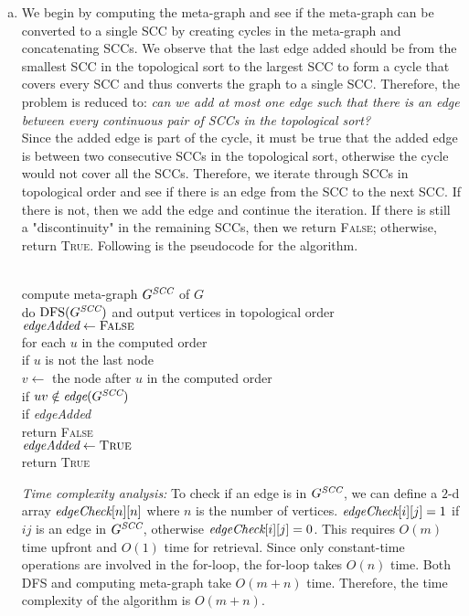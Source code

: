 \documentclass[11pt]{article}
\begin{document}
\begin{solution}
\begin{enumerate}[(a)]
\item We begin by computing the meta-graph and see if the meta-graph can be converted to a single SCC by creating cycles in the meta-graph and concatenating SCCs. We observe that the last edge added should be from the smallest SCC in the topological sort to the largest SCC to form a cycle that covers every SCC and thus converts the graph to a single SCC. Therefore, the problem is reduced to: \emph{can we add at most one edge such that there is an edge between every continuous pair of SCCs in the topological sort?}\\
Since the added edge is part of the cycle, it must be true that the added edge is between two consecutive SCCs in the topological sort, otherwise the cycle would not cover all the SCCs. Therefore, we iterate through SCCs in topological order and see if there is an edge from the SCC to the next SCC. If there is not, then we add the edge and continue the iteration. If there is still a "discontinuity" in the remaining SCCs, then we return \textsc{False}; otherwise, return \textsc{True}. Following is the pseudocode for the algorithm.
\begin{algo}
	\textsc{}\+
\\	compute meta-graph $G^{\emph{SCC}}$ of $G$
\\	do $\text{DFS}(G^{\emph{SCC}})$ and output vertices in topological order
\\	$\emph{edgeAdded}\gets \textsc{False}$
\\	for each $u$ in the computed order\+
\\	if $u$ is not the last node\+
\\	$v\gets$ the node after $u$ in the computed order
\\	if $uv\notin \emph{edge}(G^{\emph{SCC}})$\+
\\	if \emph{edgeAdded}\+
\\	return \textsc{False}\-
\\	$\emph{edgeAdded}\gets \textsc{True}$\-\-\-
\\	return \textsc{True}\-
\end{algo}
\emph{Time complexity analysis: }To check if an edge is in $G^{\emph{SCC}}$, we can define a $2$-d array $\emph{edgeCheck}[n][n]$ where $n$ is the number of vertices. $\emph{edgeCheck}[i][j]=1$ if $ij$ is an edge in $G^{\emph{SCC}}$, otherwise $\emph{edgeCheck}[i][j]=0$. This requires $O(m)$ time upfront and $O(1)$ time for retrieval. Since only constant-time operations are involved in the for-loop, the for-loop takes $O(n)$ time. Both DFS and computing meta-graph take $O(m+n)$ time. Therefore, the time complexity of the algorithm is $O(m+n)$.
\end{enumerate}
\end{solution}
\end{document}
